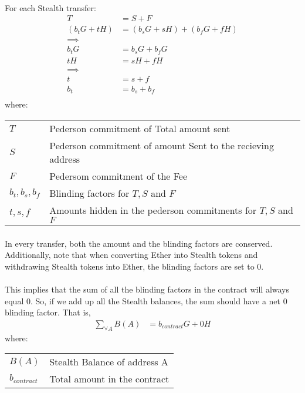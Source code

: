 \documentclass{article}
\begin{document}
\paragraph{}
For each Stealth transfer:
\begin{align*}
T &= S + F \\
(b_tG + tH) &= (b_sG + sH) + (b_fG + fH) \\
\implies \\
b_tG &= b_sG + b_fG \\
tH &= sH + fH \\
\implies \\
t &= s + f \\
b_t &= b_s + b_f \\
\end{align*}
where:
\begin{tabular}{l @{ $=$ } l}
$T$ & Pederson commitment of Total amount sent\\
$S$ & Pederson commitment of amount Sent to the recieving address\\
$F$ & Pedersom commitment of the Fee \\
$b_t, b_s, b_f$ & Blinding factors for $T, S$ and $F$ \\
$t, s, f$ & Amounts hidden in the pederson commitments for $T, S$ and $F$
\end{tabular}

\paragraph{}
In every transfer, both the amount and the blinding factors are conserved. Additionally, note that when converting Ether into Stealth tokens and withdrawing Stealth tokens into Ether, the blinding factors are set to 0. 
\paragraph{}
This implies that the sum of all the blinding factors in the contract will always equal 0. So, if we add up all the Stealth balances, the sum should have a net 0 blinding factor. That is,
\begin{align*}
\sum_{\forall A} B(A) &= b_{contract}G + 0H
\end{align*}
where:
\begin{tabular}{l @{ $=$ } l}
$B(A)$ & Stealth Balance of address A\\
$b_{contract}$ & Total amount in the contract\\
\end{tabular}
\end{document}

